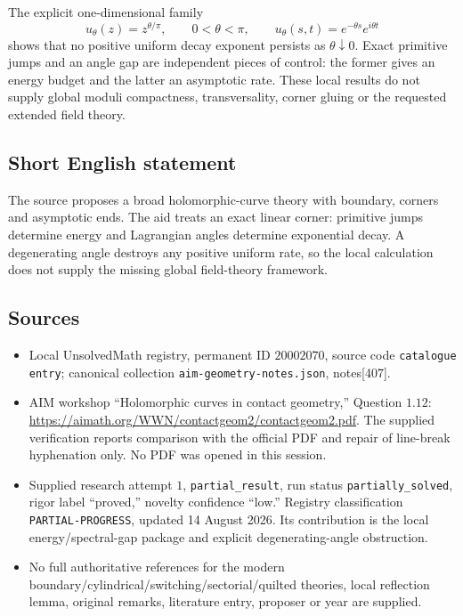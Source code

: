 \documentclass[11pt]{article}
\begin{document}
The explicit one-dimensional family
\[
 u_\theta(z)=z^{\theta/\pi},\qquad0<\theta<\pi,
 \qquad u_\theta(s,t)=e^{-\theta s}e^{i\theta t}
\]
shows that no positive uniform decay exponent persists as \(\theta\downarrow0\). Exact primitive jumps and an angle gap are independent pieces of control: the former gives an energy budget and the latter an asymptotic rate. These local results do not supply global moduli compactness, transversality, corner gluing or the requested extended field theory.
\subsection{Short English statement}
The source proposes a broad holomorphic-curve theory with boundary, corners and asymptotic ends. The aid treats an exact linear corner: primitive jumps determine energy and Lagrangian angles determine exponential decay. A degenerating angle destroys any positive uniform rate, so the local calculation does not supply the missing global field-theory framework.
\subsection{Sources}
\begin{itemize}
\item Local UnsolvedMath registry, permanent ID \(20002070\), source code \texttt{catalogue entry}; canonical collection \texttt{aim-geometry-notes.json}, notes[407].
\item AIM workshop ``Holomorphic curves in contact geometry,'' Question \(1.12\): \url{https://aimath.org/WWN/contactgeom2/contactgeom2.pdf}. The supplied verification reports comparison with the official PDF and repair of line-break hyphenation only. No PDF was opened in this session.
\item Supplied research attempt \(1\), \texttt{partial\_result}, run status \texttt{partially\_solved}, rigor label ``proved,'' novelty confidence ``low.'' Registry classification \texttt{PARTIAL-PROGRESS}, updated 14 August 2026. Its contribution is the local energy/spectral-gap package and explicit degenerating-angle obstruction.
\item No full authoritative references for the modern boundary/cylindrical/switching/sectorial/quilted theories, local reflection lemma, original remarks, literature entry, proposer or year are supplied.
\end{itemize}
\end{document}
